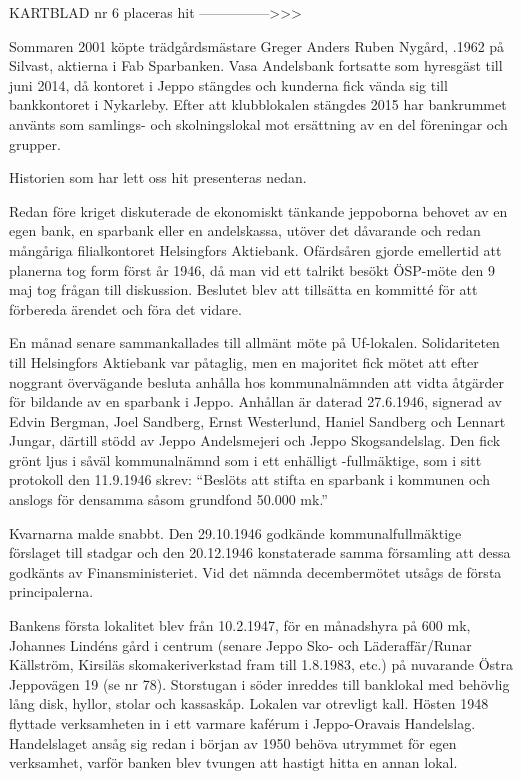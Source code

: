 
KARTBLAD nr 6 placeras hit --------------->>>




Sommaren 2001 köpte trädgårdsmästare Greger Anders Ruben	Nygård, .1962 på Silvast, aktierna i Fab Sparbanken. Vasa 	Andelsbank fortsatte som hyresgäst till juni 2014, då kontoret i Jeppo stängdes och kunderna fick vända sig till bankkontoret i Nykarleby. Efter att klubblokalen stängdes 2015 har bankrummet använts som samlings- och skolningslokal mot ersättning av en del föreningar och grupper.

Historien som har lett oss hit presenteras nedan.




Redan före kriget diskuterade de ekonomiskt tänkande jeppoborna behovet av en egen bank, en sparbank eller en andelskassa, utöver det dåvarande och redan mångåriga filialkontoret Helsingfors Aktiebank. Ofärdsåren gjorde emellertid att planerna tog form först år 1946, då man vid ett talrikt besökt ÖSP-möte den 9 maj tog frågan till diskussion. Beslutet blev att tillsätta en kommitté för att förbereda ärendet och föra det vidare.

En månad senare sammankallades till allmänt möte på Uf-lokalen. Solidariteten till Helsingfors Aktiebank var påtaglig, men en majoritet fick mötet att efter noggrant övervägande besluta anhålla hos kommunalnämnden att vidta åtgärder för bildande av en sparbank i Jeppo. Anhållan är daterad 27.6.1946, signerad av Edvin Bergman, Joel Sandberg, Ernst Westerlund, Haniel Sandberg och Lennart Jungar, därtill stödd av Jeppo Andelsmejeri och Jeppo Skogsandelslag. Den fick grönt ljus i såväl kommunalnämnd som i ett enhälligt -fullmäktige, som i sitt protokoll den 11.9.1946 skrev: ``Beslöts att stifta en sparbank i kommunen och anslogs för densamma såsom grundfond 50.000 mk.''

Kvarnarna malde snabbt. Den 29.10.1946 godkände kommunalfullmäktige förslaget till stadgar och den 20.12.1946 konstaterade samma församling att dessa godkänts av Finansministeriet. Vid det nämnda decembermötet utsågs de första principalerna.

Bankens första lokalitet blev från 10.2.1947, för en månadshyra på 600 mk, Johannes Lindéns gård i centrum (senare Jeppo Sko- och Läderaffär/Runar Källström, Kirsiläs skomakeriverkstad fram till 1.8.1983, etc.) på nuvarande Östra Jeppovägen 19 (se nr 78). Storstugan i söder inreddes till banklokal med behövlig lång disk, hyllor, stolar och kassaskåp. Lokalen var otrevligt kall. Hösten 1948 flyttade verksamheten in i ett varmare kaférum i Jeppo-Oravais Handelslag. Handelslaget ansåg sig redan i början av 1950 behöva utrymmet för egen verksamhet, varför banken blev tvungen att hastigt hitta en annan lokal.

